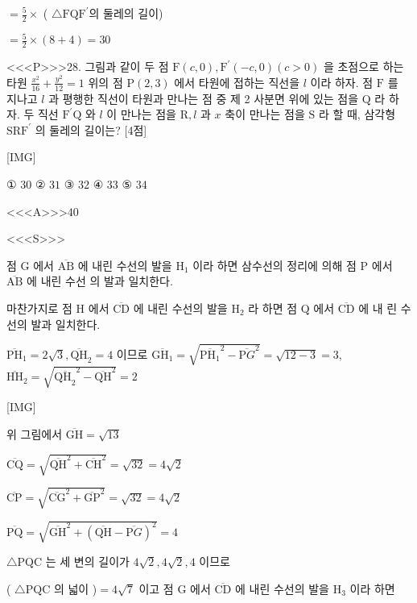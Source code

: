 \documentclass{oblivoir}
\begin{document}
$=\frac{5}{2} \times$ ( $\triangle \mathrm{FQF}^{\prime}$의 둘레의 길이)

$=\frac{5}{2} \times(8+4)=30$


<<<P>>>28. 그림과 같이 두 점 $\mathrm{F}(c, 0), \mathrm{F}^{\prime}(-c, 0)(c>0)$ 을 초점으로 하는 타원 $\frac{x^{2}}{16}+\frac{y^{2}}{12}=1$ 위의 점 $\mathrm{P}(2,3)$ 에서 타원에 접하는 직선을 $l$ 이라 하자. 점 $\mathrm{F}$ 를 지나고 $l$ 과 평행한 직선이 타원과 만나는 점 중 제 2 사분면 위에 있는 점을 $\mathrm{Q}$ 라 하자. 두 직선 $\mathrm{F}^{\prime} \mathrm{Q}$ 와 $l$ 이 만나는 점을 $\mathrm{R}, l$ 과 $x$ 축이 만나는 점을 $\mathrm{S}$ 라 할 때, 삼각형 $\mathrm{SRF}^{\prime}$ 의 둘레의 길이는? [4점]


[IMG]

① $30$
② $31$
③ $32$
④ $33$
⑤ $34$



<<<A>>>$40$

<<<S>>>



점 $\mathrm{G}$ 에서 $\overline{\mathrm{AB}}$ 에 내린 수선의 발을 $\mathrm{H}_{1}$ 이라 하면 삼수선의 정리에 의해 점 $\mathrm{P}$ 에서 $\overline{\mathrm{AB}}$ 에 내린 수선 의 발과 일치한다.

마찬가지로 점 $\mathrm{H}$ 에서 $\overline{\mathrm{CD}}$ 에 내린 수선의 발을 $\mathrm{H}_{2}$ 라 하면 점 $\mathrm{Q}$ 에서 $\overline{\mathrm{CD}}$ 에 내 린 수선의 발과 일치한다.

$\overline{\mathrm{PH}}_{1}=2 \sqrt{3}, \overline{\mathrm{QH}}_{2}=4$ 이므로
$\overline{\mathrm{GH}_{1}}=\sqrt{\overline{\mathrm{PH}_{1}}^{2}-\overline{\mathrm{P} G}^{2}}=\sqrt{12-3}=3$,
$\overline{\mathrm{HH}}_{2}=\sqrt{\overline{\mathrm{QH}_{2}}^{2}-\overline{\mathrm{QH}}^{2}}=2$

[IMG]

위 그림에서 $\overline{\mathrm{GH}}=\sqrt{13}$

$\overline{\mathrm{CQ}}=\sqrt{\overline{\mathrm{QH}}^{2}+\overline{\mathrm{CH}}^{2}}=\sqrt{32}=4 \sqrt{2}$

$\overline{\mathrm{CP}}=\sqrt{\overline{\mathrm{CG}}^{2}+\overline{\mathrm{GP}}^{2}}=\sqrt{32}=4 \sqrt{2}$

$\overline{\mathrm{PQ}}=\sqrt{\overline{\mathrm{GH}}^{2}+(\overline{\mathrm{QH}}-\overline{\mathrm{P} G})^{2}}=4$

$\triangle \mathrm{P} \mathrm{QC}$ 는 세 변의 길이가 $4 \sqrt{2}, 4 \sqrt{2}, 4$ 이므로

( $\triangle \mathrm{PQC}$ 의 넓이 )$=4 \sqrt{7}$ 이고 점 $\mathrm{G}$ 에서 $\overline{\mathrm{CD}}$ 에 내린 수선의 발을 $\mathrm{H}_{3}$ 이라 하면
\end{document}
